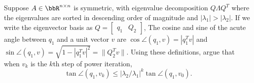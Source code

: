 \documentclass[12pt, leqno]{article}
\begin{document}

Suppose $A \in \bbR^{n \times n}$ is symmetric, with eigenvalue decomposition 
$Q \Lambda Q^T$ where the eigenvalues are sorted in descending order of magnitude
and $|\lambda_1| > |\lambda_2|$.  If we write the eigenvector basis as
$Q = \begin{bmatrix} q_1 & Q_2 \end{bmatrix}$,
The cosine and sine of the acute angle between
$q_1$ and a unit vector $v$ are $\cos \angle(q_1,v) = |q_1^T v|$ and 
$\sin \angle(q_1,v) = \sqrt{1-|q_1^T v|^2} = \|Q_2^T v\|$.
Using these definitions, argue that when $v_k$ is the $k$th step of power
iteration,
\[
  \tan \angle(q_1,v_k) \leq |\lambda_2/\lambda_1|^k \tan \angle(q_1, v_0).
\]
\end{document}
